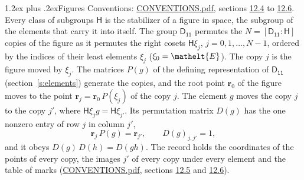 \documentclass[10pt,a4paper]{article}
\makeatletter
\renewcommand\section{\@startsection{section}{1}{\z@}{-3ex plus -1ex minus -.2ex}%
  {1.2ex plus .2ex}{\normalfont\large\sffamily\bfseries\color{parttitle}}}
\numberwithin{equation}{section}
\newcommand{\eltfont}[1]{{\let\sigma\eltsigma\mathelt{#1}}}
\newcommand{\grp}[1]{\mathsf{#1}}
\newcommand{\cls}[1]{\eltfont{#1}}
\newcommand{\pointr}{\mathbf{r}}
\makeatother
\begin{document}
\section{Figures}\label{s:permutation}
Conventions: \href{../../CONVENTIONS.pdf}{CONVENTIONS.pdf}, sections \href{../../CONVENTIONS.pdf\#conv.12.4}{12.4} to \href{../../CONVENTIONS.pdf\#conv.12.6}{12.6}.
Every class of subgroups $\grp{H}$ is the stabilizer of a figure in space, the subgroup of the elements that carry it into itself. \label{n:local.orbit.size}\label{n:element.coset.least}\label{n:index.coset}The group $\grp{D_{11}}$ permutes the $N = [\grp{D_{11}} : \grp{H}]$ copies of the figure as it permutes the right cosets $\grp{H}\xi_j$, $j = 0, 1, \dots, N - 1$, ordered by the indices of their least elements $\xi_j$ ($\xi_0 = \cls{E}$). The copy $j$ is the figure moved by $\xi_j$. The matrices $P(g)$ of the defining representation of $\grp{D_{11}}$ (section~\ref{s:elements}) generate the copies, and the root point $\pointr_0$ of the figure moves to the point $\pointr_j = \pointr_0\, P(\xi_j)$ of the copy $j$. \label{n:local.coset.image}The element $g$ moves the copy $j$ to the copy $j'$, where $\grp{H}\xi_j g = \grp{H}\xi_{j'}$. \label{n:local.matrix.permutation}Its permutation matrix $D(g)$ has the one nonzero entry of row $j$ in column $j'$,
\begin{equation}\label{e:perm.matrix}\pointr_j\, P(g) = \pointr_{j'}, \qquad D(g)_{j,j'} = 1,\end{equation}
and it obeys $D(g)\, D(h) = D(gh)$. The record holds the coordinates of the points of every copy, the images $j'$ of every copy under every element and the table of marks (\href{../../CONVENTIONS.pdf}{CONVENTIONS.pdf}, sections \href{../../CONVENTIONS.pdf\#conv.12.5}{12.5} and \href{../../CONVENTIONS.pdf\#conv.12.6}{12.6}).
\end{document}
